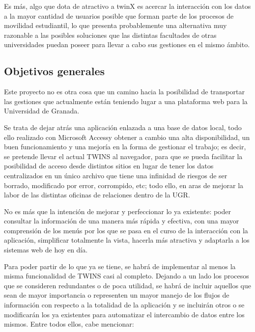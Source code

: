 Es más, algo que dota de atractivo a twinX es acercar la interacción con los datos a la mayor cantidad de usuarios posible que forman parte de los procesos de movilidad estudiantil, lo que presenta probablemente una alternativa muy razonable a las posibles soluciones que las distintas facultades de otras universidades puedan poseer para llevar a cabo sus gestiones en el mismo ámbito.

\subsection{Objetivos generales}

Este proyecto no es otra cosa que un camino hacia la posibilidad de transportar las gestiones que actualmente están teniendo lugar a una plataforma web para la Universidad de Granada.

Se trata de dejar atrás una aplicación enlazada a una base de datos local, todo ello realizado con Microsoft Access\textregistered y obtener a cambio una alta disponibilidad, un buen funcionamiento y una mejoría en la forma de gestionar el trabajo; es decir, se pretende llevar el actual TWINS al navegador, para que se pueda facilitar la posibilidad de acceso desde distintos sitios en lugar de tener los datos centralizados en un único archivo que tiene una infinidad de riesgos de ser borrado, modificado por error, corrompido, etc; todo ello, en aras de mejorar la labor de las distintas oficinas de relaciones dentro de la UGR.

No es más que la intención de mejorar y perfeccionar lo ya existente: poder consultar la información de una manera más rápida y efectiva, con una mayor comprensión de los menús por los que se pasa en el curso de la interacción con la aplicación, simplificar totalmente la vista, hacerla más atractiva y adaptarla a los sistemas web de hoy en día.

Para poder partir de lo que ya se tiene, se habrá de implementar al menos la misma funcionalidad de TWINS casi al completo. Dejando a un lado los procesos que se consideren redundantes o de poca utilidad, se habrá de incluir aquellos que sean de mayor importancia o representen un mayor manejo de los flujos de información con respecto a la totalidad de la aplicación y se incluirán otros o se modificarán los ya existentes para automatizar el intercambio de datos entre los mismos. Entre todos ellos, cabe mencionar:

